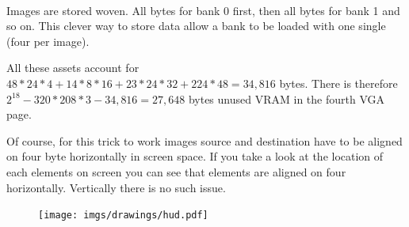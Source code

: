     \begin{minipage}{.3\textwidth}
  \end{minipage}
\begin{minipage}{.3\textwidth}
  \end{minipage}
\begin{minipage}{.3\textwidth}
  \end{minipage}
\par

    \begin{minipage}{.3\textwidth}
  \end{minipage}
\begin{minipage}{.3\textwidth}
  \end{minipage}
\begin{minipage}{.3\textwidth}
  \end{minipage}
\par


\begin{minipage}{.1\textwidth}
  \end{minipage}
\begin{minipage}{.1\textwidth}
  \end{minipage}
\begin{minipage}{.1\textwidth}
  \end{minipage}
\begin{minipage}{.1\textwidth}
  \end{minipage}
  \begin{minipage}{.3\textwidth}
  \end{minipage}
\begin{minipage}{.3\textwidth}
  \end{minipage}\

 Images are stored woven. All bytes for bank 0 first, then all bytes for bank 1 and so on. This clever way to store data allow a bank to be loaded with one single  (four  per image).\\
\par
All these assets account for $48*24*4+14*8*16+23*24*32+224*48=34,816$ bytes. There is therefore $2^18-320*208*3 - 34,816=27,648$ bytes unused VRAM in the fourth VGA page.\\
\par
Of course, for this trick to work images source and destination have to be aligned on four byte horizontally in screen space. If you take a look at the location of each elements on screen you can see that elements are aligned on four horizontally. Vertically there is no such issue.
\begin{figure}[H]
  \centering
 \texttt{[image: imgs/drawings/hud.pdf]}
\end{figure}

